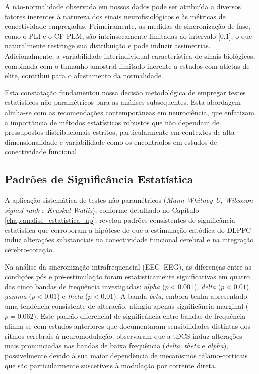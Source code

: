 A não-normalidade observada em nossos dados pode ser atribuída a diversos fatores inerentes à natureza dos sinais neurofisiológicos e às métricas de conectividade empregadas. Primeiramente, as medidas de sincronização de fase, como o PLI e o CF-PLM, são intrinsecamente limitadas ao intervalo [0,1], o que naturalmente restringe sua distribuição e pode induzir assimetrias. Adicionalmente, a variabilidade interindividual característica de sinais biológicos, combinada com o tamanho amostral limitado inerente a estudos com atletas de elite, contribui para o afastamento da normalidade.

Esta constatação fundamentou nossa decisão metodológica de empregar testes estatísticos não paramétricos para as análises subsequentes. Esta abordagem alinha-se com as recomendações contemporâneas em neurociência, que enfatizam a importância de métodos estatísticos robustos que não dependam de pressupostos distribucionais estritos, particularmente em contextos de alta dimensionalidade e variabilidade como os encontrados em estudos de conectividade funcional \cite{bullmore2009complex}.

\subsection{Padrões de Significância Estatística}
A aplicação sistemática de testes não paramétricos (\textit{Mann-Whitney U}, \textit{Wilcoxon signed-rank} e \textit{Kruskal-Wallis}), conforme detalhado no Capítulo \ref{chap:analise_estatistica_np}, revelou padrões consistentes de significância estatística que corroboram a hipótese de que a estimulação catódica do DLPFC induz alterações substanciais na conectividade funcional cerebral e na integração cérebro-coração.

Na análise da sincronização intrafrequencial (EEG--EEG), as diferenças entre as condições pós e pré-estimulação foram estatisticamente significativas em quatro das cinco bandas de frequência investigadas: \emph{alpha} ($p < 0.001$), \emph{delta} ($p < 0.01$), \emph{gamma} ($p < 0.01$) e \emph{theta} ($p < 0.01$). A banda \emph{beta}, embora tenha apresentado uma tendência consistente de alteração, atingiu apenas significância marginal ($p = 0.062$). Este padrão diferencial de significância entre bandas de frequência alinha-se com estudos anteriores que documentaram sensibilidades distintas dos ritmos cerebrais à neuromodulação. \cite{kunze2014high} observaram que a tDCS induz alterações mais pronunciadas nas bandas de baixa frequência (\emph{delta}, \emph{theta} e \emph{alpha}), possivelmente devido à sua maior dependência de mecanismos tálamo-corticais que são particularmente suscetíveis à modulação por corrente direta.

